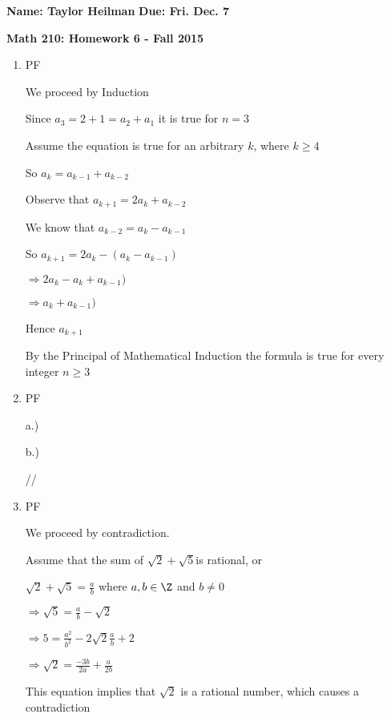 \documentclass[12pt]{article}
\begin{document}
\textbf{Name: Taylor Heilman}    \hspace{4in} \textbf{Due: Fri. Dec. 7}
\begin{center} \textbf{Math 210: Homework 6 - Fall 2015} \end{center}

\begin{enumerate}

\item 

{PF

We proceed by Induction

Since $a_{3} = 2 + 1 = a_{2} + a_{1}$ it is true for $n = 3$

Assume the equation is true for an arbitrary $k$, where $k \geq 4$

So $a_{k} = a_{k-1} + a_{k-2}$

Observe that $a_{k+1} = 2a_{k} + a_{k-2}$

We know that $ a_{k-2} = a_{k} - a_{k-1}$

So $a_{k+1} = 2a_{k} - (a_{k} - a_{k-1})$

$\Rightarrow  2a_{k} - a_{k} + a_{k-1})$

$\Rightarrow  a_{k}  + a_{k-1})$

Hence $a_{k+1} $

By the Principal of Mathematical Induction the formula is true for every integer $n \geq 3$
}


\item 

{PF

a.)


b.)


//
}





\item 

{PF

We proceed by contradiction.

Assume that the sum of $\sqrt{2} + \sqrt{5} $is rational, or

$\sqrt{2} + \sqrt{5} = \frac{a}{b}$ where $a,b \in \Z$ and $b \neq 0$

$\Rightarrow \sqrt{5} = \frac{a}{b} - \sqrt{2}$

$\Rightarrow 5 = \frac{a^2}{b^2} - 2 \sqrt{2}\frac{a}{b} + 2$

$\Rightarrow \sqrt{2} = \frac{-3b}{2a} +  \frac{a}{2b}$

This equation implies that $\sqrt{2}$ is a rational number, which causes a contradiction

}
\end{enumerate}
\end{document}
